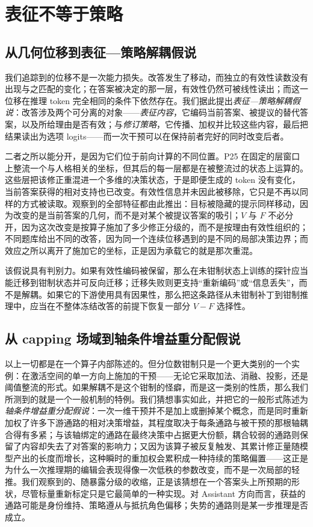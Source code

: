 \documentclass[UTF8,letterpaper,10pt,twocolumn]{ctexart}
\begin{document}
\section{表征不等于策略}
\label{sec:implications-zh}

\subsection{从几何位移到表征—策略解耦假说}

我们追踪到的位移不是一次能力损失。改答发生了移动，而独立的有效性读数没有出现与之匹配的变化；在答案被决定的那一层，有效性仍然可被线性读出；而这一位移在推理 token 完全相同的条件下依然存在。我们据此提出\emph{表征—策略解耦假说}：改答涉及两个可分离的对象——\emph{表征内容}，它编码当前答案、被提议的替代答案，以及所给理由是否有效；与\emph{修订策略}，它传播、加权并比较这些内容，最后把结果读出为选项 logits——而一次干预可以在保持前者完好的同时改变后者。

二者之所以能分开，是因为它们位于前向计算的不同位置。P25 在固定的层窗口上整流一个与人格相关的坐标，但其后的每一层都是在被整流过的状态上运算的。这些层把该修正重混进一个多维的决策状态，于是即便生成的 token 没有变化，当前答案获得的相对支持也已改变。有效性信息并未因此被移除，它只是不再以同样的方式被读取。观察到的全部特征都由此推出：目标被隐藏的提示同样移动，因为改变的是当前答案的几何，而不是对某个被提议答案的吸引；$V$ 与 $F$ 不必分开，因为这次改变是按算子施加了多少修正分级的，而不是按理由有效性组织的；不同题库给出不同的改答，因为同一个连续位移遇到的是不同的局部决策边界；而效应之所以离开了施加它的坐标，正是因为承载它的就是那次重混。

该假说具有判别力。如果有效性编码被保留，那么在未钳制状态上训练的探针应当能迁移到钳制状态并可反向迁移；迁移失败则更支持“重新编码”或“信息丢失”，而不是解耦。如果它的下游使用具有因果性，那么把这条路径从未钳制补丁到钳制推理中，应当在不整体冻结改答的前提下恢复一部分 $V-F$ 选择性。

\subsection{从 capping 场域到轴条件增益重分配假说}

以上一切都是在一个算子内部陈述的。但分位数钳制只是一个更大类别的一个实例：在激活空间的单一方向上施加的干预——无论它采取加法、消融、投影，还是阈值整流的形式。如果解耦不是这个钳制的怪癖，而是这一类别的性质，那么我们所测到的就是一个一般机制的特例。我们猜想事实如此，并把它的一般形式陈述为\emph{轴条件增益重分配假说}：一次一维干预并不是加上或删掉某个概念，而是同时重新加权了许多下游通路的相对决策增益，其程度取决于每条通路与被干预的那根轴耦合得有多紧；与该轴绑定的通路在最终决策中占据更大份额，耦合较弱的通路则保留了内容却失去了对答案的影响力；又因为该算子被反复触发、其累计修正量随模型产出的长度而增长，这种瞬时的重加权会累积成一种持续的策略偏置——这正是为什么一次推理期的编辑会表现得像一次低秩的参数改变，而不是一次局部的轻推。我们观察到的、随暴露分级的收缩，正是该猜想在一个答案头上所预期的形状，尽管标量重新标定只是它最简单的一种实现。对 Assistant 方向而言，获益的通路可能是身份维持、策略遵从与抵抗角色偏移；失势的通路则是某一步推理是否成立。
\end{document}
